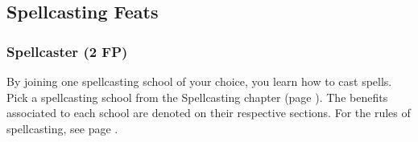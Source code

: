\subsection*{Spellcasting Feats}



\subsubsection{Spellcaster (2 FP)} \label{feat::spellcaster}
    By joining one spellcasting school of your choice, you learn how to cast spells.
    Pick a spellcasting school from the Spellcasting chapter (page \pageref{ch::spellcasting}).
    The benefits associated to each school are denoted on their respective sections.
    For the rules of spellcasting, see page \pageref{sec::spellcastingrules}.

